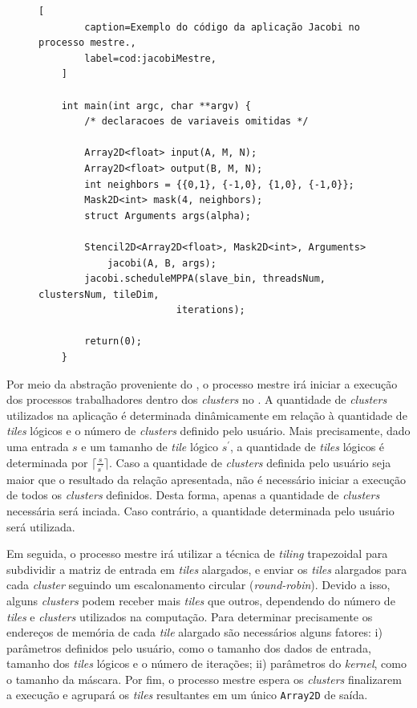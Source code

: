 \newlength\someheight
\setlength\someheight{3cm}

\begin{figure}[t]
	\begin{lstlisting}[
		caption=Exemplo do código da aplicação Jacobi no processo mestre.,
		label=cod:jacobiMestre,
	]

	int main(int argc, char **argv) {
		/* declaracoes de variaveis omitidas */

		Array2D<float> input(A, M, N);
		Array2D<float> output(B, M, N);
		int neighbors = {{0,1}, {-1,0}, {1,0}, {-1,0}};
		Mask2D<int> mask(4, neighbors);
		struct Arguments args(alpha);

		Stencil2D<Array2D<float>, Mask2D<int>, Arguments>
			jacobi(A, B, args);
		jacobi.scheduleMPPA(slave_bin, threadsNum, clustersNum, tileDim,
                        iterations);

		return(0);
	}
\end{lstlisting}
\end{figure}

Por meio da abstração proveniente do \pskel, o processo mestre irá iniciar a
execução dos processos trabalhadores dentro dos \textit{clusters} no \mppa. A
quantidade de \textit{clusters} utilizados na aplicação é determinada
dinâmicamente em relação à quantidade de \textit{tiles} lógicos e o número de
\textit{clusters} definido pelo usuário.  Mais precisamente, dado uma entrada
$s$ e um tamanho de \textit{tile} lógico $s^\prime$, a quantidade de
\textit{tiles} lógicos é determinada por $\lceil\frac{s}{s^\prime}\rceil$. Caso
a quantidade de \textit{clusters} definida pelo usuário seja maior que o
resultado da relação apresentada, não é necessário iniciar a execução de todos
os \textit{clusters} definidos. Desta forma, apenas a quantidade de
\textit{clusters} necessária será inciada. Caso contrário, a quantidade
determinada pelo usuário será utilizada.

Em seguida, o processo mestre irá utilizar a técnica de \textit{tiling}
trapezoidal para subdividir a matriz de entrada em \textit{tiles} alargados, e
enviar os \textit{tiles} alargados para cada \textit{cluster} seguindo um
escalonamento circular (\textit{round-robin}).  Devido a isso, alguns
\textit{clusters} podem receber mais \textit{tiles} que outros, dependendo do
número de \textit{tiles} e \textit{clusters} utilizados na computação. Para
determinar precisamente os endereços de memória de cada \textit{tile} alargado
são necessários alguns fatores: i) parâmetros definidos pelo usuário, como o
tamanho dos dados de entrada, tamanho dos \textit{tiles} lógicos e o número de
iterações; ii) parâmetros do \stencil \textit{kernel}, como o tamanho da
máscara. Por fim, o processo mestre espera os \textit{clusters} finalizarem a
execução e agrupará os \textit{tiles} resultantes em um único \texttt{Array2D}
de saída.


